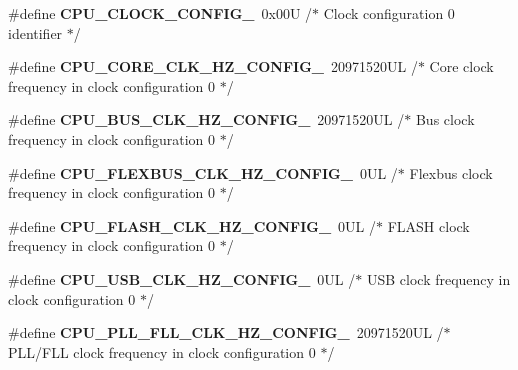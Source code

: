 \begin{DoxyCompactItemize}
\item 
\hypertarget{group___cpu__module_ga4d7ade6a1c335a7e5233938aa9197157}{\#define {\bfseries C\-P\-U\-\_\-\-C\-L\-O\-C\-K\-\_\-\-C\-O\-N\-F\-I\-G\-\_}~0x00\-U /$\ast$ Clock configuration 0 identifier $\ast$/}\label{group___cpu__module_ga4d7ade6a1c335a7e5233938aa9197157}

\item 
\hypertarget{group___cpu__module_ga6fe0b841d40421ee48af4a4e01e48ddf}{\#define {\bfseries C\-P\-U\-\_\-\-C\-O\-R\-E\-\_\-\-C\-L\-K\-\_\-\-H\-Z\-\_\-\-C\-O\-N\-F\-I\-G\-\_}~20971520\-U\-L /$\ast$ Core clock frequency in clock configuration 0 $\ast$/}\label{group___cpu__module_ga6fe0b841d40421ee48af4a4e01e48ddf}

\item 
\hypertarget{group___cpu__module_gaf060a047649b9537eb77354ab7917a8b}{\#define {\bfseries C\-P\-U\-\_\-\-B\-U\-S\-\_\-\-C\-L\-K\-\_\-\-H\-Z\-\_\-\-C\-O\-N\-F\-I\-G\-\_}~20971520\-U\-L /$\ast$ Bus clock frequency in clock configuration 0 $\ast$/}\label{group___cpu__module_gaf060a047649b9537eb77354ab7917a8b}

\item 
\hypertarget{group___cpu__module_ga706c0d4dd14c93181b7a99badddc9a51}{\#define {\bfseries C\-P\-U\-\_\-\-F\-L\-E\-X\-B\-U\-S\-\_\-\-C\-L\-K\-\_\-\-H\-Z\-\_\-\-C\-O\-N\-F\-I\-G\-\_}~0\-U\-L /$\ast$ Flexbus clock frequency in clock configuration 0 $\ast$/}\label{group___cpu__module_ga706c0d4dd14c93181b7a99badddc9a51}

\item 
\hypertarget{group___cpu__module_ga09c9820f38d931a0400b832d2582c6f7}{\#define {\bfseries C\-P\-U\-\_\-\-F\-L\-A\-S\-H\-\_\-\-C\-L\-K\-\_\-\-H\-Z\-\_\-\-C\-O\-N\-F\-I\-G\-\_}~0\-U\-L /$\ast$ F\-L\-A\-S\-H clock frequency in clock configuration 0 $\ast$/}\label{group___cpu__module_ga09c9820f38d931a0400b832d2582c6f7}

\item 
\hypertarget{group___cpu__module_ga7bf843fdf59af5fcaf48bea898884a3e}{\#define {\bfseries C\-P\-U\-\_\-\-U\-S\-B\-\_\-\-C\-L\-K\-\_\-\-H\-Z\-\_\-\-C\-O\-N\-F\-I\-G\-\_}~0\-U\-L /$\ast$ U\-S\-B clock frequency in clock configuration 0 $\ast$/}\label{group___cpu__module_ga7bf843fdf59af5fcaf48bea898884a3e}

\item 
\hypertarget{group___cpu__module_gad2aaa2918b640ae3833fc84e8f983c3c}{\#define {\bfseries C\-P\-U\-\_\-\-P\-L\-L\-\_\-\-F\-L\-L\-\_\-\-C\-L\-K\-\_\-\-H\-Z\-\_\-\-C\-O\-N\-F\-I\-G\-\_}~20971520\-U\-L /$\ast$ P\-L\-L/\-F\-L\-L clock frequency in clock configuration 0 $\ast$/}\label{group___cpu__module_gad2aaa2918b640ae3833fc84e8f983c3c}


\end{DoxyCompactItemize}
